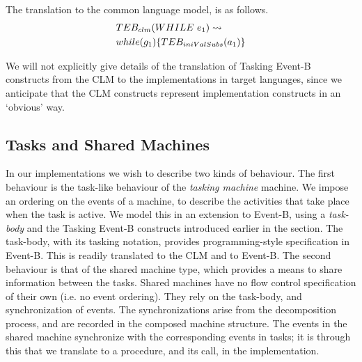 The translation to the common language model, is as follows.
\begin{equation}
\begin{split}
&TEB_{clm}(WHILE~ e_1 ) \leadsto\\
& while(g_1)\{ TEB_{iniValSubs}(a_1) \}
\end{split}
\notag
\end{equation}

We will not explicitly give details of the translation of Tasking Event-B constructs from the CLM to the implementations in target languages, since we anticipate that the CLM constructs represent implementation constructs in an `obvious' way. 

\subsection{Tasks and Shared Machines}\label{tasks}
In our implementations we wish to describe two kinds of behaviour. The first behaviour is the task-like behaviour of the \emph{tasking machine} machine. We impose an ordering on the events of a machine, to describe the activities that take place when the task is active. We model this in an extension to Event-B, using a \emph{task-body} and the Tasking Event-B constructs introduced earlier in the section. The task-body, with its tasking notation, provides programming-style specification in Event-B. This is readily translated to the CLM and to Event-B. The second behaviour is that of the shared machine type, which provides a means to share information between the tasks. Shared machines have no flow control specification of their own (i.e. no event ordering). They rely on the task-body, and synchronization of events. The synchronizations arise from the decomposition process, and are recorded in the composed machine structure. The events in the shared machine synchronize with the corresponding events in tasks; it is through this that we translate to a procedure, and its call, in the implementation. 

